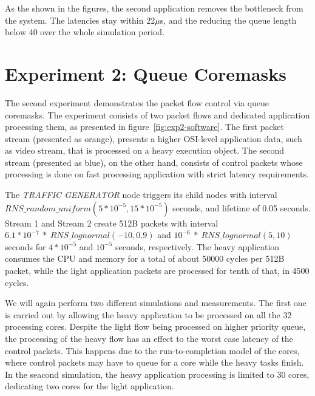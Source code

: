 As the shown in the figures, the second application removes the bottleneck from the system. The latencies stay within 22$\mu$s, and the reducing the queue length below 40 over the whole simulation period.

\section{Experiment 2: Queue Coremasks}

The second experiment demonstrates the packet flow control via queue coremasks. The experiment consists of two packet flows and dedicated application processing them, as presented in figure~\ref{fig:exp2-software}. The first packet stream (presented as orange), presents a higher OSI-level application data, such as video stream, that is processed on a heavy execution object. The second stream (presented as blue), on the other hand, consists of control packets whose processing is done on fast processing application with strict latency requirements.

The \emph{TRAFFIC GENERATOR} node triggers its child nodes with interval $RNS\_random\_uniform(5*10^{-5}, 15*10^{-5})$ seconds, and lifetime of 0.05 seconds. Stream 1 and Stream 2 create 512B packets with interval $6.1*10^{-7}~*~RNS\_lognormal(-10, 0.9)$ and $10^{-6}~*~RNS\_lognormal(5, 10)$ seconds for $4*10^{-5}$ and $10^{-5}$ seconds, respectively. The heavy application consumes the CPU and memory for a total of about 50000 cycles per 512B packet, while the light application packets are processed for tenth of that, in 4500 cycles.

We will again perform two different simulations and measurements. The first one is carried out by allowing the heavy application to be processed on all the 32 processing cores. Despite the light flow being processed on higher priority queue, the processing of the heavy flow has an effect to the worst case latency of the control packets. This happens due to the run-to-completion model of the cores, where control packets may have to queue for a core while the heavy tasks finish. In the seacond simulation, the heavy application processing is limited to 30 cores, dedicating two cores for the light application.

